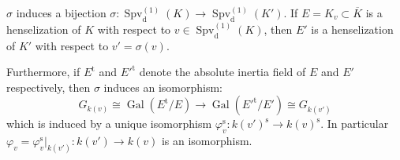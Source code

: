 \begin{lemma}\label{3.2}
$\sigma$ induces a bijection $\sigma:\operatorname{Spv}_\text{d}^{(1)}(K) \to\operatorname{Spv}_\text{d}^{(1)}(K')$. If $E=K_v\subset\overline{K}$ is a henselization of $K$ with respect to $v\in\operatorname{Spv}_\text{d}^{(1)}(K)$, then $E'$ is a henselization of $K'$ with respect to $v'=\sigma(v)$. 

Furthermore, if $E^{\text{t}}$ and $E'^{\text{t}}$ denote the absolute inertia field of $E$ and $E'$ respectively, then $\sigma$ induces an isomorphism:
\[ G_{k(v)}\cong\operatorname{Gal}(E^\text{t}/E) \to\operatorname{Gal}(E'^{\text{t}}/E')\cong G_{k(v')} \]
which is induced by a unique isomorphism $\varphi_v^\text{s}:k(v')^\text{s}\to k(v)^\text{s}$. In particular $\varphi_v=\varphi_v^\text{s}|_{k(v')}:k(v')\to k(v)$ is an isomorphism.
\end{lemma}

